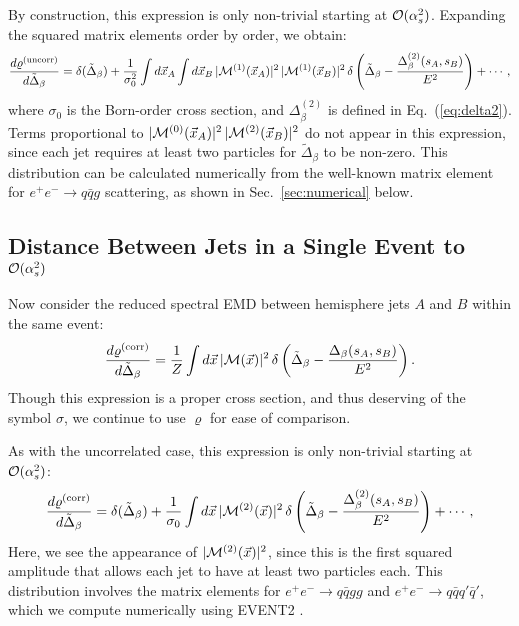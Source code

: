 \documentclass[letterpaper,11pt]{article}
\DeclareRobustCommand{\Sec}[1]{Sec.~\ref{#1}}
\DeclareRobustCommand{\Eq}[1]{Eq.~(\ref{#1})}
\begin{document}
By construction, this expression is only non-trivial starting at ${\cal O}(\alpha_s^2)$.
%
Expanding the squared matrix elements order by order, we obtain:
%
\begin{equation}
\label{eq:eejetuncorr}
%
\frac{d\varrho^{(\text{uncorr})}}{d\tilde \Delta_\beta} = \delta(\tilde \Delta_\beta) + \frac{1}{\sigma^2_0} \int d\vec x_A \int d\vec x_B\, |{\cal M}^{(1)}(\vec x_A)|^2\, |{\cal M}^{(1)}(\vec x_B)|^2\,\delta\left(\tilde \Delta_\beta-\frac{\Delta^{(2)}_\beta(s_A, s_B)}{E^2} \right) + \cdots,
\end{equation}
%
where $\sigma_0$ is the Born-order cross section, and $\Delta^{(2)}_\beta$ is defined in \Eq{eq:delta2}.
%
Terms proportional to $|{\cal M}^{(0)}(\vec x_A)|^2\, |{\cal M}^{(2)}(\vec x_B)|^2$ do not appear in this expression, since each jet requires at least two particles for $\tilde \Delta_\beta$ to be non-zero.
%
This distribution can be calculated numerically from the well-known matrix element for $e^+e^-\to q\bar q g$ scattering, as shown in \Sec{sec:numerical} below.


\subsection{Distance Between Jets in a Single Event to ${\cal O}(\alpha_s^2)$}
\label{sec:fixed_order_single}

Now consider the reduced spectral EMD between hemisphere jets $A$ and $B$ within the same event:
%
\begin{align}
\frac{d\varrho^{(\text{corr})}}{d\tilde \Delta_\beta} = \frac{1}{Z} \int d\vec x\, |{\cal M}(\vec x)|^2\,\delta\left(\tilde \Delta_\beta - \frac{\Delta_\beta(s_A, s_B)}{E^2} \right).
\end{align}
%
Though this expression is a proper cross section, and thus deserving of the symbol $\sigma$, we continue to use $\varrho$ for ease of comparison.


As with the uncorrelated case, this expression is only non-trivial starting at ${\cal O}(\alpha_s^2)$:
%
\begin{equation}
\frac{d\varrho^{(\text{corr})}}{d\tilde \Delta_\beta} = \delta(\tilde \Delta_\beta) + \frac{1}{\sigma_0} \int d\vec x\, |{\cal M}^{(2)}(\vec x)|^2\,\delta\left(\tilde \Delta_\beta-\frac{\Delta^{(2)}_\beta(s_A, s_B)}{E^2} \right)+\cdots,
\end{equation}
%
Here, we see the appearance of $|{\cal M}^{(2)}(\vec x)|^2$, since this is the first squared amplitude that allows each jet to have at least two particles each.
%
This distribution involves the matrix elements for $e^+e^-\to q\bar q gg$ and  $e^+e^-\to q\bar q q' \bar q'$, which we compute numerically using EVENT2 \cite{Catani:1996vz}.
\end{document}
